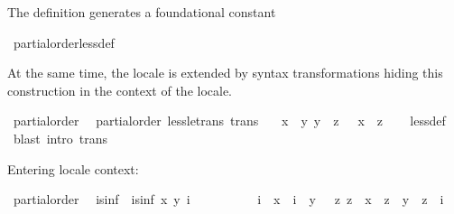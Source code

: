 \begin{isabellebody}
\begin{isamarkuptext}%
The definition generates a foundational constant %
\end{isamarkuptext}\isamarkuptrue%
\isamarkupfalse%
\ partial{\isacharunderscore}{\kern0pt}order{\isachardot}{\kern0pt}less{\isacharunderscore}{\kern0pt}def%
\begin{isamarkuptext}%
At the same time, the locale is extended by syntax transformations hiding
this construction in the context of the locale.%
\end{isamarkuptext}\isamarkuptrue%
\isamarkupfalse%
{\isacharbang}{\kern0pt}\ partial{\isacharunderscore}{\kern0pt}order\isanewline
\isanewline
{}\isamarkupfalse%
\ {\isacharparenleft}{\kern0pt}\ partial{\isacharunderscore}{\kern0pt}order{\isacharparenright}{\kern0pt}\ less{\isacharunderscore}{\kern0pt}le{\isacharunderscore}{\kern0pt}trans\ {\isacharbrackleft}{\kern0pt}trans{\isacharbrackright}{\kern0pt}{\isacharcolon}{\kern0pt}\isanewline
\ \ {\isachardoublequoteopen}{\isasymlbrakk}\ x\ {\isasymsqsubset}\ y{\isacharsemicolon}{\kern0pt}\ y\ {\isasymsqsubseteq}\ z\ {\isasymrbrakk}\ {\isasymLongrightarrow}\ x\ {\isasymsqsubset}\ z{\isachardoublequoteclose}\isanewline
%
\isadelimproof
\ \ %
\endisadelimproof
%
\isatagproof
{}\isamarkupfalse%
\ less{\isacharunderscore}{\kern0pt}def\ \isamarkupfalse%
\ {\isacharparenleft}{\kern0pt}blast\ intro{\isacharcolon}{\kern0pt}\ trans{\isacharparenright}{\kern0pt}%
\endisatagproof
{\isafoldproof}%
%
\isadelimproof
%
\endisadelimproof
%
\isadelimdocument
%
\endisadelimdocument
%
\isatagdocument
%
\isamarkuptrue%
%
\endisatagdocument
{\isafolddocument}%
%
\isadelimdocument
%
\endisadelimdocument
%
\begin{isamarkuptext}%
Entering locale context:%
\end{isamarkuptext}\isamarkuptrue%
\isamarkupfalse%
\ partial{\isacharunderscore}{\kern0pt}order\isanewline
\isanewline
{}\isanewline
\isanewline
{}\isamarkupfalse%
\isanewline
\ \ is{\isacharunderscore}{\kern0pt}inf\ \ {\isachardoublequoteopen}is{\isacharunderscore}{\kern0pt}inf\ x\ y\ i\ {\isacharequal}{\kern0pt}\isanewline
\ \ \ \ \ \ \ \ \ {\isacharparenleft}{\kern0pt}i\ {\isasymsqsubseteq}\ x\ {\isasymand}\ i\ {\isasymsqsubseteq}\ y\ {\isasymand}\ {\isacharparenleft}{\kern0pt}{\isasymforall}\ z{\isachardot}{\kern0pt}\ z\ {\isasymsqsubseteq}\ x\ {\isasymand}\ z\ {\isasymsqsubseteq}\ y\ {\isasymlongrightarrow}\ z\ {\isasymsqsubseteq}\ i{\isacharparenright}{\kern0pt}{\isacharparenright}{\kern0pt}{\isachardoublequoteclose}\isanewline

\end{isabellebody}
